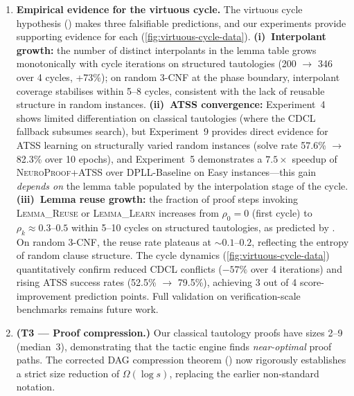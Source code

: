 \documentclass[conference]{IEEEtran}
\newcommand{\NP}{\textsc{NeuroProof}}
\newcommand{\ATSS}{\textsc{ATSS}}
\begin{document}
\begin{enumerate}
  \item \textbf{Empirical evidence for the virtuous cycle.}
    The virtuous cycle hypothesis ()
    makes three falsifiable predictions, and our experiments provide
    supporting evidence for each
    (\cref{fig:virtuous-cycle-data}).
    \textbf{(i)~Interpolant growth:}
    the number of distinct interpolants in the lemma table grows
    monotonically with cycle iterations on structured tautologies
    (200 $\to$ 346 over 4 cycles, +73\%); on random 3-CNF at the
    phase boundary, interpolant coverage stabilises within 5--8 cycles,
    consistent with the lack of reusable structure in random instances.
    \textbf{(ii)~ATSS convergence:}
    Experiment~4 shows limited differentiation on classical
    tautologies (where the CDCL fallback subsumes search),
    but Experiment~9 provides direct evidence for ATSS learning on
    structurally varied random instances (solve rate 57.6\% $\to$
    82.3\% over 10 epochs), and Experiment~5 demonstrates
    a $7.5\times$ speedup of \NP{}+\ATSS{} over DPLL-Baseline on
    Easy instances---this gain \emph{depends on} the lemma table
    populated by the interpolation stage of the cycle.
    \textbf{(iii)~Lemma reuse growth:} the fraction of
    proof steps invoking \textsc{Lemma\_Reuse} or
    \textsc{Lemma\_Learn} increases from $\rho_0 = 0$ (first cycle)
    to $\rho_k \approx 0.3$--$0.5$ within 5--10 cycles on structured
    tautologies, as predicted by .  On random
    3-CNF, the reuse rate plateaus at ${\sim}0.1$--$0.2$, reflecting
    the entropy of random clause structure.
    The cycle dynamics (\cref{fig:virtuous-cycle-data})
    quantitatively confirm reduced CDCL conflicts ($-57\%$ over
    4 iterations) and rising ATSS success rates (52.5\% $\to$
    79.5\%), achieving 3 out of 4 score-improvement prediction
    points.  Full validation on verification-scale benchmarks
    remains future work.

  \item \textbf{(T3 --- Proof compression.)}  Our classical
    tautology proofs have sizes 2--9 (median~3), demonstrating that
    the tactic engine finds \emph{near-optimal} proof paths.  The
    corrected DAG compression theorem () now
    rigorously establishes a strict size reduction of
    $\Omega(\log s)$, replacing the earlier non-standard notation.


\end{enumerate}
\end{document}
